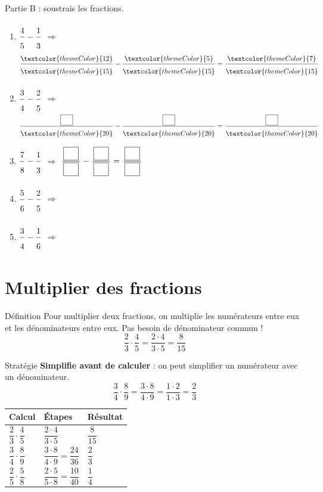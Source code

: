 \medskip
\textcolor{themeColor}{Partie B} : soustrais les fractions.

\begin{enumerate}[leftmargin=*,align=parleft, label=\alph*), itemsep=9pt, start=6]
\item $\FA{4}{5}-\FA{1}{3}$ \quad $\Longrightarrow$ \quad $\FA{\textcolor{themeColor}{12}}{\textcolor{themeColor}{15}}-\FA{\textcolor{themeColor}{5}}{\textcolor{themeColor}{15}}=\FA{\textcolor{themeColor}{7}}{\textcolor{themeColor}{15}}$
\item $\FA{3}{4}-\FA{2}{5}$ \quad $\Longrightarrow$ \quad $\FA{\CaseC}{\textcolor{themeColor}{20}}-\FA{\CaseC}{\textcolor{themeColor}{20}}=\FA{\CaseC}{\textcolor{themeColor}{20}}$
\item $\FA{7}{8}-\FA{1}{3}$ \quad $\Longrightarrow$ \quad $\FA{\CaseC}{\CaseC}-\FA{\CaseC}{\CaseC}=\FA{\CaseC}{\CaseC}$
\item $\FA{5}{6}-\FA{2}{5}$ \quad $\Longrightarrow$
\item $\FA{3}{4}-\FA{1}{6}$ \quad $\Longrightarrow$
\end{enumerate}


\newpage
\section{Multiplier des fractions}\label{sec:MultiplierFractions}

\begin{regle}{Définition}
Pour \textcolor{themeColor}{multiplier} deux fractions, on multiplie les numérateurs entre eux et les dénominateurs entre eux. Pas besoin de dénominateur commun !
\[\dfrac{2}{3} \cdot \dfrac{4}{5}=\dfrac{2 \cdot 4}{3 \cdot 5}=\dfrac{8}{15}\]
\end{regle}

\vspace{20pt}
\begin{astuce}{Stratégie}
\textbf{Simplifie avant de calculer} : on peut simplifier un numérateur avec un dénominateur.
\[\dfrac{3}{4} \cdot \dfrac{8}{9}=\dfrac{3 \cdot 8}{4 \cdot 9}=\dfrac{1 \cdot 2}{1 \cdot 3}=\dfrac{2}{3}\]
\end{astuce}

\vspace{20pt}
\def\arraystretch{3}
\begin{tabularx}{\linewidth}{|>{\centering\arraybackslash}X|>{\centering\arraybackslash}X|>{\centering\arraybackslash}X|}
\hline
\cellcolor{themeNO!30}\textbf{Calcul} & \cellcolor{themeNO!30}\textbf{Étapes} & \cellcolor{themeNO!30}\textbf{Résultat} \\\hline
$\dfrac{2}{3}\cdot\dfrac{4}{5}$ & $\dfrac{2 \cdot 4}{3 \cdot 5}$ & $\dfrac{8}{15}$ \\\hline
$\dfrac{3}{4}\cdot\dfrac{8}{9}$ & $\dfrac{3 \cdot 8}{4 \cdot 9}=\dfrac{24}{36}$ & $\dfrac{2}{3}$ \\\hline
$\dfrac{2}{5}\cdot\dfrac{5}{8}$ & $\dfrac{2 \cdot 5}{5 \cdot 8}=\dfrac{10}{40}$ & $\dfrac{1}{4}$ \\\hline
\end{tabularx}
\def\arraystretch{1}


